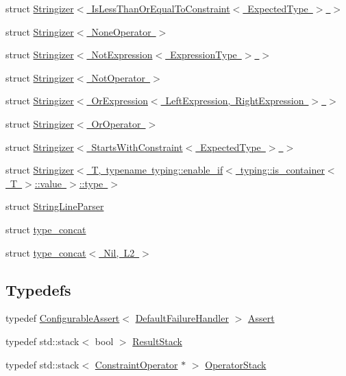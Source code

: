 \begin{DoxyCompactItemize}
\item 
struct \mbox{\hyperlink{structsnowhouse_1_1Stringizer_3_01IsLessThanOrEqualToConstraint_3_01ExpectedType_01_4_01_4}{Stringizer$<$ Is\+Less\+Than\+Or\+Equal\+To\+Constraint$<$ Expected\+Type $>$ $>$}}
\item 
struct \mbox{\hyperlink{structsnowhouse_1_1Stringizer_3_01NoneOperator_01_4}{Stringizer$<$ None\+Operator $>$}}
\item 
struct \mbox{\hyperlink{structsnowhouse_1_1Stringizer_3_01NotExpression_3_01ExpressionType_01_4_01_4}{Stringizer$<$ Not\+Expression$<$ Expression\+Type $>$ $>$}}
\item 
struct \mbox{\hyperlink{structsnowhouse_1_1Stringizer_3_01NotOperator_01_4}{Stringizer$<$ Not\+Operator $>$}}
\item 
struct \mbox{\hyperlink{structsnowhouse_1_1Stringizer_3_01OrExpression_3_01LeftExpression_00_01RightExpression_01_4_01_4}{Stringizer$<$ Or\+Expression$<$ Left\+Expression, Right\+Expression $>$ $>$}}
\item 
struct \mbox{\hyperlink{structsnowhouse_1_1Stringizer_3_01OrOperator_01_4}{Stringizer$<$ Or\+Operator $>$}}
\item 
struct \mbox{\hyperlink{structsnowhouse_1_1Stringizer_3_01StartsWithConstraint_3_01ExpectedType_01_4_01_4}{Stringizer$<$ Starts\+With\+Constraint$<$ Expected\+Type $>$ $>$}}
\item 
struct \mbox{\hyperlink{structsnowhouse_1_1Stringizer_3_01T_00_01typename_01typing_1_1enable__if_3_01typing_1_1is__contacfdff2199417d834dd78a5716bd32df6}{Stringizer$<$ T, typename typing\+::enable\+\_\+if$<$ typing\+::is\+\_\+container$<$ T $>$\+::value $>$\+::type $>$}}
\item 
struct \mbox{\hyperlink{structsnowhouse_1_1StringLineParser}{String\+Line\+Parser}}
\item 
struct \mbox{\hyperlink{structsnowhouse_1_1type__concat}{type\+\_\+concat}}
\item 
struct \mbox{\hyperlink{structsnowhouse_1_1type__concat_3_01Nil_00_01L2_01_4}{type\+\_\+concat$<$ Nil, L2 $>$}}
\end{DoxyCompactItemize}
\subsection*{Typedefs}
\begin{DoxyCompactItemize}
\item 
typedef \mbox{\hyperlink{structsnowhouse_1_1ConfigurableAssert}{Configurable\+Assert}}$<$ \mbox{\hyperlink{structsnowhouse_1_1DefaultFailureHandler}{Default\+Failure\+Handler}} $>$ \mbox{\hyperlink{namespacesnowhouse_a973f131b742877a7484a9bf8e1768515}{Assert}}
\item 
typedef std\+::stack$<$ bool $>$ \mbox{\hyperlink{namespacesnowhouse_a719169b1315a13161c15f25e600a8f51}{Result\+Stack}}
\item 
typedef std\+::stack$<$ \mbox{\hyperlink{structsnowhouse_1_1ConstraintOperator}{Constraint\+Operator}} $\ast$ $>$ \mbox{\hyperlink{namespacesnowhouse_adcb10e215e6a4bbcb35722a9c7270fc6}{Operator\+Stack}}
\end{DoxyCompactItemize}
